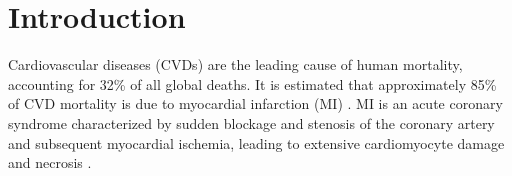 \documentclass[sn-mathphys,Numbered]{sn-jnl}%
\theoremstyle{thmstyleone}%
\theoremstyle{thmstyletwo}%
\theoremstyle{thmstylethree}%
\begin{document}


\maketitle

\section{Introduction}\label{introduction}

Cardiovascular diseases (CVDs) are the leading cause of human mortality,
accounting for 32\% of all global deaths. It is estimated that
approximately 85\% of CVD mortality is due to myocardial infarction (MI) \cite{CVD}. MI is an acute coronary
syndrome characterized by sudden blockage and stenosis of the coronary
artery and subsequent myocardial ischemia, leading to extensive
cardiomyocyte damage and necrosis \cite{Macro}.
\end{document}
